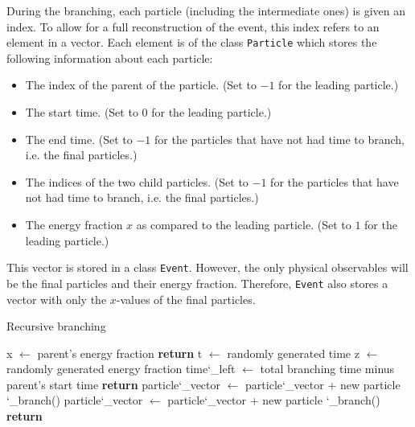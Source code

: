 \documentclass[a4paper,12pt]{article}
\numberwithin{equation}{section}
\begin{document}


During the branching, each particle (including the intermediate ones) is given an index. To allow for a full reconstruction of the event, this index refers to an element in a vector. Each element is of the class {\tt Particle} which stores the following information about each particle:
\begin{itemize}
\item The index of the parent of the particle. (Set to $-1$ for the leading particle.)
\item The start time. (Set to $0$ for the leading particle.)
\item The end time. (Set to $-1$ for the particles that have not had time to branch, i.e. the final particles.)
\item The indices of the two child particles. (Set to $-1$ for the particles that have not had time to branch, i.e. the final particles.)
\item The energy fraction $x$ as compared to the leading particle. (Set to $1$ for the leading particle.)
\end{itemize}
This vector is stored in a class {\tt Event}. However, the only physical observables will be the final particles and their energy fraction. Therefore, {\tt Event} also stores a vector with only the $x$-values of the final particles. 


\begin{algorithm}
\caption{Recursive branching}\label{branchingAlg}
\begin{tt}
\begin{algorithmic}[0]
\State x $\gets$ parent's energy fraction
 
\State \textbf{return}
\EndIf
\State t $\gets$ randomly generated time
\State z $\gets$ randomly generated energy fraction
\State time\char`_left $\gets$ total branching time minus parent's start time
 
\State \textbf{return}
\EndIf
\State particle\char`_vector $\gets$ particle\char`_vector + new particle
\State \char`_branch()
\State particle\char`_vector $\gets$ particle\char`_vector + new particle
\State \char`_branch()
\State \textbf{return}
\EndFunction
\end{algorithmic}
\end{tt}
\end{algorithm}
\end{document}

